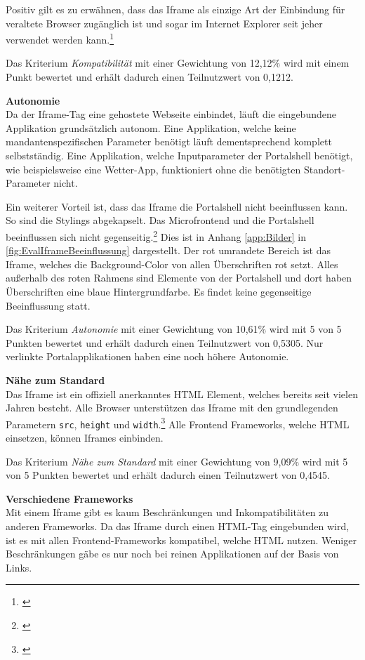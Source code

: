 Positiv gilt es zu erwähnen, dass das Iframe als einzige Art der Einbindung für veraltete Browser zugänglich ist und sogar im Internet Explorer seit jeher verwendet werden kann.\footnote{\cite[vgl.][]{MDNWebDocs2021a}}

Das Kriterium \textit{Kompatibilität} mit einer Gewichtung von 12,12\% wird mit einem Punkt bewertet und erhält dadurch einen Teilnutzwert von 0,1212.

\textbf{Autonomie}\\
Da der Iframe-Tag eine gehostete Webseite einbindet, läuft die eingebundene Applikation grundsätzlich autonom. Eine Applikation, welche keine mandantenspezifischen Parameter benötigt läuft dementsprechend komplett selbstständig. Eine Applikation, welche Inputparameter der Portalshell benötigt, wie beispielsweise eine Wetter-App, funktioniert ohne die benötigten Standort-Parameter nicht.

Ein weiterer Vorteil ist, dass das Iframe die Portalshell nicht beeinflussen kann. So sind die Stylings abgekapselt. Das Microfrontend und die Portalshell beeinflussen sich nicht gegenseitig.\footnote{\cite[vgl.][35]{Geers2020}} Dies ist in Anhang \ref{app:Bilder} in \cref{fig:EvalIframeBeeinflussung} dargestellt. Der rot umrandete Bereich ist das Iframe, welches die Background-Color von allen Überschriften rot setzt. Alles außerhalb des roten Rahmens sind Elemente von der Portalshell und dort haben Überschriften eine blaue Hintergrundfarbe. Es findet keine gegenseitige Beeinflussung statt.

Das Kriterium \textit{Autonomie} mit einer Gewichtung von 10,61\% wird mit 5 von 5 Punkten bewertet und erhält dadurch einen Teilnutzwert von 0,5305. Nur verlinkte Portalapplikationen haben eine noch höhere Autonomie.

\textbf{Nähe zum Standard}\\
Das Iframe ist ein offiziell anerkanntes \gls{HTML} Element, welches bereits seit vielen Jahren besteht. Alle Browser unterstützen das Iframe mit den grundlegenden Parametern \texttt{src}, \texttt{height} und \texttt{width}.\footnote{\cite[vgl.][]{MDNWebDocs2021a}} Alle Frontend Frameworks, welche \gls{HTML} einsetzen, können Iframes einbinden.

Das Kriterium \textit{Nähe zum Standard} mit einer Gewichtung von 9,09\% wird mit 5 von 5 Punkten bewertet und erhält dadurch einen Teilnutzwert von 0,4545.

\textbf{Verschiedene Frameworks}\\
Mit einem Iframe gibt es kaum Beschränkungen und Inkompatibilitäten zu anderen Frameworks. Da das Iframe durch einen \gls{HTML}-Tag eingebunden wird, ist es mit allen Frontend-Frameworks kompatibel, welche \gls{HTML} nutzen. Weniger Beschränkungen gäbe es nur noch bei reinen Applikationen auf der Basis von Links.

